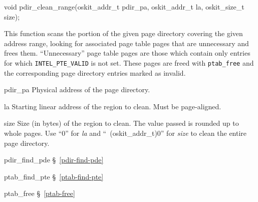 \label{pdir-clean-range}
\begin{apisyn}

	\funcproto void pdir_clean_range(oskit_addr_t pdir_pa,
			                 oskit_addr_t la, oskit_size_t size);
\end{apisyn}
\begin{apidesc}
	This function scans the portion of the given page directory
	covering the given address range, looking for associated
	page table pages that are unnecessary and frees them.
	``Unnecessary'' page table pages are those which contain only entries
	for which {\tt INTEL_PTE_VALID} is not set.
	These pages are freed with {\tt ptab_free} and the corresponding page
	directory entries marked as invalid.
\end{apidesc}
\begin{apiparm}
	\item[pdir_pa]
		Physical address of the page directory.
	\item[la]
		Starting linear address of the region to clean.
		Must be page-aligned.
	\item[size]
		Size (in bytes) of the region to clean.
		The value passed is rounded up to whole pages.
		Use ``0'' for \emph{la} and ``~(oskit_addr_t)0'' for
		\emph{size} to clean the entire page directory.
\end{apiparm}
\begin{apidep}
	\item[pdir_find_pde]	\S~\ref{pdir-find-pde}
	\item[ptab_find_pte]	\S~\ref{ptab-find-pte}
	\item[ptab_free]	\S~\ref{ptab-free}
\end{apidep}

